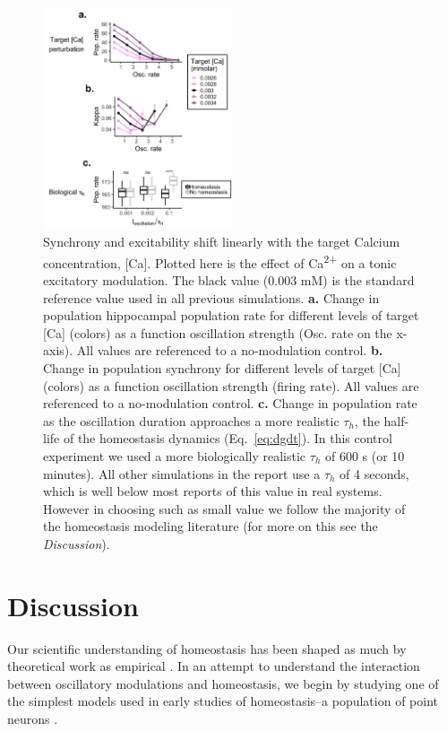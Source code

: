 \documentclass{article}
\begin{document}
\begin{figure}
\centering
\includegraphics[width=0.5\textwidth]{fig4.png}
\caption{\label{fig:f4}
    Synchrony and excitability shift linearly with the target Calcium concentration, [Ca]. Plotted here is the effect of Ca\textsuperscript{2+} on a tonic excitatory modulation. The black value (0.003 mM) is the standard reference value used in all previous simulations.
    \textbf{a.} Change in population hippocampal population rate for different levels of target [Ca] (colors) as a function oscillation strength (Osc. rate on the x-axis). All values are referenced to a no-modulation control.
    \textbf{b.} Change in population synchrony for different levels of target [Ca] (colors) as a function oscillation strength (firing rate). All values are referenced to a no-modulation control.
    \textbf{c.} Change in population rate as the oscillation duration approaches a more realistic $\tau_h$, the half-life of the homeostasis dynamics (Eq.~\ref{eq:dgdt}). In this control experiment we used a more biologically realistic $\tau_h$ of 600 s (or 10 minutes). All other simulations in the report use a $\tau_h$ of 4 seconds, which is well below most reports of this value in real systems. However in choosing such as small value we follow the majority of the homeostasis modeling literature (for more on this see the \textit{Discussion}).
}
\end{figure}


\section*{Discussion}
Our scientific understanding of homeostasis has been shaped as much by theoretical work as empirical \cite{Marder2014}. In an attempt to understand the interaction between oscillatory modulations and homeostasis, we begin by studying one of the simplest models used in early studies of homeostasis--a population of point neurons \cite{LeMasson1993}.
\end{document}

